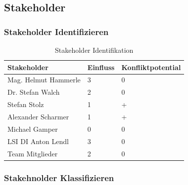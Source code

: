 \subsection{Stakeholder}
\subsubsection{Stakeholder Identifizieren}
\begin{table}[h]
	\centering
	\begin{tabular}{|lll|}
		\hline
		Stakeholder          & Einfluss &  Konfliktpotential      \\ \hline                         
		Mag. Helmut Hammerle & 3         & 0                  \\ 
		Dr. Stefan Walch     & 2         & 0                  \\
		Stefan Stolz         & 1         & +                  \\ 
		Alexander Scharmer   & 1         & +                  \\ 
		Michael Gamper       & 0         & 0                  \\ 
		LSI DI Anton Lendl   & 3         & 0                  \\ 
		Team Mitglieder      & 2         & 0                   \\ \hline			
	\end{tabular}
	\caption{Stakeholder Identifikation}
	\label{Tbl_Stakeholder_Identifikation}
\end{table}


\subsubsection{Stakehnolder Klassifizieren}	

